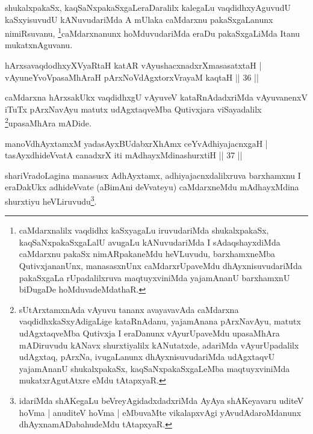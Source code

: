 \begin{artha}
shukalxpakaSx, kaqSaNxpakaSxgaLeraDaralilx kalegaLu vaqdidhxyAguvudU kaSxyisuvudU kANuvudariMda A mUlaka caMdarxnu pakaSxgaLanunx nimiRsuvanu, \footnote{caMdarxnalilx vaqdidhx kaSxyagaLu iruvudariMda shukalxpakaSx, kaqSaNxpakaSxgaLalU avugaLu kANuvudariMda I sAdaqshayxdiMda caMdarxnu pakaSx nimARpakaneMdu heVLuvudu, barxhamxneMba QutivxjananUnx, manasasxnUnx caMdarxrUpaveMdu dhAyxnisuvudariMda pakaSxgaLa rUpadalilxruva maqtuyxviniMda yajamAnanU barxhamxnU biDugaDe hoMduvadeMdathaR.}caMdarxnanunx hoMduvudariMda eraDu pakaSxgaLiMda Itanu mukatxnAguvanu.
\end{artha}


\begin{shl}
hArxsavaqdodhxyXVyaRtaH katAR vAyushacxnadxrXmasasatxtaH |\\
vAyuneYvoVpasaMhAraH pArxNoVdAgxtorxVrayaM kaqtaH \hfill || 36 ||
\end{shl}

\begin{artha}
caMdarxna hArxsakUkx vaqdidhxgU vAyuveV kataRnAdadxriMda vAyuvanenxV iTuTx pArxNavAyu matutx udAgxtaqveMba Qutivxjara viSayadalilx \footnote{sUtArxtamxnAda vAyuvu tananx avayavavAda caMdarxna vaqdidhxkaSxyAdigaLige kataRnAdanu, yajamAnana pArxNavAyu, matutx udAgxtaqveMba Qutivxja I eraDanunx vAyurUpaveMdu upasaMhAra mADiruvudu kANavx shurxtiyalilx kANutatxde, adariMda vAyurUpadalilx udAgxtaq, pArxNa, ivugaLanunx dhAyxnisuvudariMda udAgxtaqvU yajamAnanU shukalxpakaSx, kaqSaNxpakaSxgaLeMba maqtuyxviniMda mukatxrAgutAtxre \ndash  eMdu tAtapxyaR.}upasaMhAra mADide.
\end{artha}


\begin{shl}
manoV\s dhAyxtamxM yadasAyxBUdabxrXhAmx ceYvAdhiyajacnxgaH |\\
tasAyxdhideVvatA canadxrX iti mAdhayxMdinashurxtiH \hfill || 37 ||
\end{shl}

\begin{artha}
shariVradoLagina manasusx AdhAyxtamx, adhiyajacnxdalilxruva barxhamxnu I eraDakUkx adhideVvate (aBimAni deVvateyu) caMdarxneMdu mAdhayxMdina shurxtiyu heVLiruvudu\footnote{idariMda shAKegaLu beVreyAgidadxdadxriMda AyAya shAKeyavaru uditeV hoVma | anuditeV hoVma | eMbuvaMte vikalapxvAgi yAvudAdaroMdanunx dhAyxnamADabahudeMdu tAtapxyaR.}.
\end{artha}

